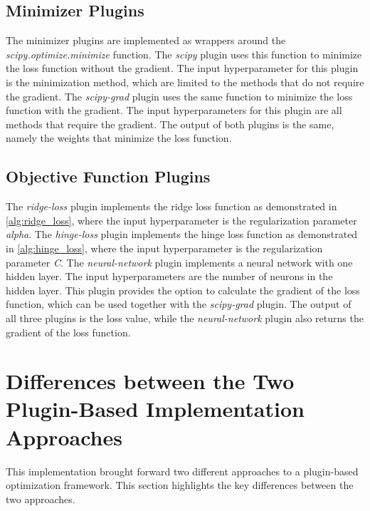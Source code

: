 \documentclass[
  a4paper,  %
  twoside,  %
  bibliography=totoc,
  headsepline,
  cleardoublepage=empty,
  parskip=half,
  draft=false
]{scrbook}
\begin{document}
\subsection{Minimizer Plugins}
\label{sec:minimizerPlugins}
The minimizer plugins are implemented as wrappers around the \emph{scipy.optimize.minimize} function.
The \emph{scipy} plugin uses this function to minimize the loss function without the gradient.
The input hyperparameter for this plugin is the minimization method, which are limited to the methods that do not require the gradient.
The \emph{scipy-grad} plugin uses the same function to minimize the loss function with the gradient.
The input hyperparameters for this plugin are all methods that require the gradient.
The output of both plugins is the same, namely the weights that minimize the loss function.

\subsection{Objective Function Plugins}
\label{sec:objectiveFunctionPlugins}
The \emph{ridge-loss} plugin implements the ridge loss function as demonstrated in \ref{alg:ridge_loss}, where the input hyperparameter is the regularization parameter \emph{alpha}.
The \emph{hinge-loss} plugin implements the hinge loss function as demonstrated in \ref{alg:hinge_loss}, where the input hyperparameter is the regularization parameter \emph{C}.
The \emph{neural-network} plugin implements a neural network with one hidden layer.
The input hyperparameters are the number of neurons in the hidden layer.
This plugin provides the option to calculate the gradient of the loss function, which can be used together with the \emph{scipy-grad} plugin.
The output of all three plugins is the loss value, while the \emph{neural-network} plugin also returns the gradient of the loss function.

\section{Differences between the Two Plugin-Based Implementation Approaches}
\label{sec:differencesBetweenTheTwoPluginBasedImplementationApproaches}
This implementation brought forward two different approaches to a plugin-based optimization framework.
This section highlights the key differences between the two approaches.
\end{document}
